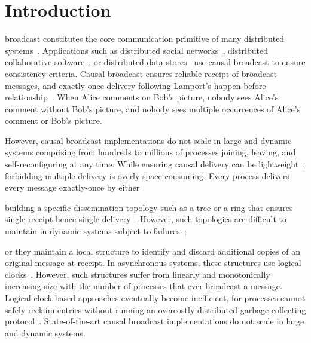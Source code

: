  
\section{Introduction}

 broadcast constitutes the core communication primitive
of many distributed systems~\cite{hadzilacos1994modular}. Applications such as
distributed social networks~\cite{borthakur2013petabyte}, distributed
collaborative software~\cite{heinrich2012exploiting,nedelec2016crate}, or
distributed data
stores~\cite{bailis2013bolton,bravo2017saturn,demers1987epidemic,lloyd2011cops,shapiro2011comprehensive}
use causal broadcast to ensure consistency criteria.  Causal broadcast ensures
reliable receipt of broadcast messages, and exactly-once delivery following
Lamport's happen before relationship~\cite{lamport1978time}. When Alice comments
on Bob's picture, nobody sees Alice's comment without Bob's picture, and nobody
sees multiple occurrences of Alice's comment or Bob's picture.

However, causal broadcast implementations do not scale in large and dynamic
systems comprising from hundreds to millions of processes joining, leaving, and
self-reconfiguring at any time. While ensuring causal delivery can be
lightweight~\cite{nedelec2018pcbroadcast}, forbidding multiple delivery is
overly space consuming. Every process delivers every message exactly-once by
either 
\begin{inparaenum}[(i)]
\item building a specific dissemination topology such as a tree or a ring that
  ensures single receipt hence single
  delivery~\cite{bravo2017saturn,raynal2013distributed}. However, such
  topologies are difficult to maintain in dynamic systems subject to
  failures~\cite{krasikova2016hashtable};
\item or they maintain a local structure to identify and discard additional
  copies of an original message at receipt. In asynchronous systems, these
  structures use logical clocks~\cite{malkhi2007concise,mukund2014optimized}.
  However, such structures suffer from linearly and monotonically increasing
  size with the number of processes that ever broadcast a message.
  Logical-clock-based approaches eventually become inefficient, for processes
  cannot safely reclaim entries without running an overcostly distributed
  garbage collecting protocol~\cite{abdullahi1998garbage}. State-of-the-art
  causal broadcast implementations do not scale in large and dynamic systems.
\end{inparaenum}

